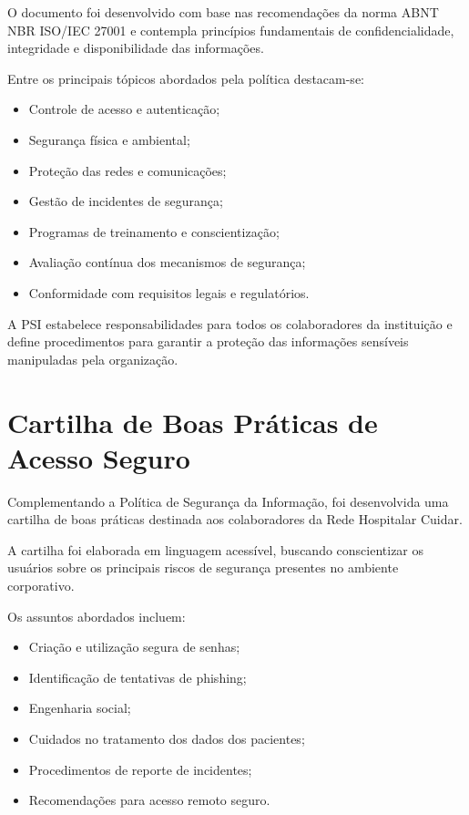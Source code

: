 \documentclass[12pt,a4paper,oneside]{report}
\begin{document}
O documento foi desenvolvido com base nas recomendações da norma ABNT NBR ISO/IEC 27001 e contempla princípios fundamentais de confidencialidade, integridade e disponibilidade das informações.

Entre os principais tópicos abordados pela política destacam-se:

\begin{itemize}[label=\color{pucblue}$\bullet$]
    \item Controle de acesso e autenticação;
    \item Segurança física e ambiental;
    \item Proteção das redes e comunicações;
    \item Gestão de incidentes de segurança;
    \item Programas de treinamento e conscientização;
    \item Avaliação contínua dos mecanismos de segurança;
    \item Conformidade com requisitos legais e regulatórios.
\end{itemize}

A PSI estabelece responsabilidades para todos os colaboradores da instituição e define procedimentos para garantir a proteção das informações sensíveis manipuladas pela organização.

\section{Cartilha de Boas Práticas de Acesso Seguro}

Complementando a Política de Segurança da Informação, foi desenvolvida uma cartilha de boas práticas destinada aos colaboradores da Rede Hospitalar Cuidar.

A cartilha foi elaborada em linguagem acessível, buscando conscientizar os usuários sobre os principais riscos de segurança presentes no ambiente corporativo.

Os assuntos abordados incluem:

\begin{itemize}[label=\color{pucblue}$\bullet$]
    \item Criação e utilização segura de senhas;
    \item Identificação de tentativas de phishing;
    \item Engenharia social;
    \item Cuidados no tratamento dos dados dos pacientes;
    \item Procedimentos de reporte de incidentes;
    \item Recomendações para acesso remoto seguro.
\end{itemize}
\end{document}
